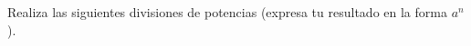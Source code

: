 \question[10] Realiza las siguientes divisiones de potencias (expresa tu resultado en la forma $a^n$).
\begin{multicols}{2}
\begin{parts}
    {\printanswers
    
    }   
     
    
    
    
    
    
    
    
    
    
\end{parts}
\end{multicols}